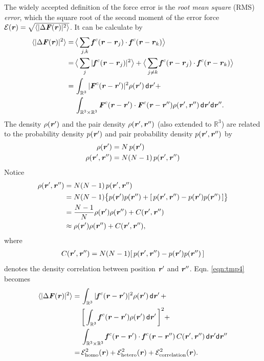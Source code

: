 \documentclass[aps,pre,preprint]{revtex4-1}
\renewcommand{\v}[1]{\textbf{\textit{#1}}}
\renewcommand{\d}[1]{\textsf{#1}}
\begin{document}
The widely accepted definition of the force error is the \emph{root
  mean square} (RMS) \emph{error}, which the square root of the second
moment of the error force $\mathcal E(\v r) =
\sqrt{\langle\vert\Delta\v F(\v r)\vert^2\rangle}$. It can be
calculate by
\begin{align} \nonumber
  \langle\vert\Delta\v F(\v r)\vert^2\rangle
  =\,&
  \big\langle\sum_{j,k}\v f^c(\v r - \v r_j)\cdot\v f^c(\v r - \v r_k)\big\rangle \\ \nonumber
  =\,&
  \big\langle\sum_j\vert\v f^c(\v r - \v r_j)\vert^2\big\rangle +
  \big\langle\sum_{j\neq k}\v f^c(\v r - \v r_j)\cdot\v f^c(\v r - \v r_k)\big\rangle \\ \nonumber
  =\,&
  \int_{\mathbb R^3}\vert\v F^c(\v r - \v r')\vert^2\rho(\v r')\,\d d\v r'
  + \\\label{eqn:tmp4}
  \,&
  \int_{\mathbb R^3\times\mathbb R^3}\v F^c(\v r - \v r')\cdot\v F^c(\v r - \v r'')\rho(\v r', \v r'')\,\d d\v r'\d d\v r''.
\end{align}
The density $\rho(\v r')$ and the pair density $\rho(\v r', \v r'')$
(also extended to $\mathbb R^3$) are related to the probability
density $p(\v r')$ and pair probability density $p(\v r', \v r'')$ by
\begin{align}
  \rho(\v r') &= N\,p(\v r') \\
  \rho(\v r', \v r'') &= N(N-1)\,p(\v r', \v r'')
\end{align}
Notice
\begin{align} \nonumber
  \rho(\v r', \v r'')
  & = N (N-1) \,p(\v r', \v r'') \\\nonumber
  & = N (N-1) \big\{ p(\v r')p(\v r'') + [\,p(\v r', \v r'') -  p(\v r')p(\v r'')\,]\big\} \\\nonumber
  &= \frac{N-1}N \rho(\v r')\rho(\v r'') + C (\v r', \v r'')\\ \label{eqn:tmp7}
  &\approx \rho(\v r')\rho(\v r'') + C (\v r', \v r''),
\end{align}
where 
\begin{align}
C (\v r', \v r'') = N (N-1) [\,p(\v r', \v r'') -  p(\v r')p(\v r'')\,]
\end{align}
denotes the density correlation between position $\v r'$ and $\v
r''$. Eqn. \eqref{eqn:tmp4} becomes
\begin{align} \nonumber
  \langle\vert\Delta\v F(\v r)\vert^2\rangle
  = &\,
  \int_{\mathbb R^3}\vert\v f^c(\v r - \v r')\vert^2\rho(\v r')\,\d d\v r' \,+ \\\nonumber
  &\,
  \bigg[\int_{\mathbb R^3}\v f^c(\v r - \v r')\rho(\v r')\,\d d\v r'\,\bigg]^2 + \\\nonumber
  &\,
  \int_{\mathbb R^3\times\mathbb R^3}\v f^c(\v r - \v r')\cdot\v f^c(\v r - \v r'')\,C(\v r', \v r'')\,\d d\v r'\d d\v r'' \\\label{eqn:tmp5}
  = &\,
  \mathcal E^2_{\textrm{homo}}(\v r) +
  \mathcal E^2_{\textrm{hetero}}(\v r) +
  \mathcal E^2_{\textrm{correlation}}(\v r).
\end{align}
\end{document}

